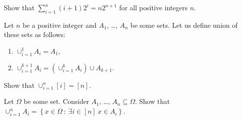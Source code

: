\documentclass[addpoints]{exam}
\begin{document}
  \pagestyle{headandfoot}
  \runningheadrule

  \firstpagefooter{}{}{}
  \runningfooter{}{}{}
  \begin{flushright}

    \vspace{0.2in}
  \end{flushright}

  \begin{questions}
    \question
      Show that $\sum_{i = 1}^n (i + 1) 2^i = n 2^{n + 1}$ for all positive integers
			$n$.

      \begin{solution}[\stretch{1}]
      \end{solution}
      \newpage
    \question
      Let $n$ be a positive integer and $A_1$, \dots, $A_n$ be some sets.
			Let us define union of these sets as follows:
			\begin{enumerate}
			    \item $\cup_{i = 1}^1 A_i = A_1$,
			    \item $\cup_{i = 1}^{k + 1} A_i =
			        (\cup_{i = 1}^{k} A_i) \cup A_{k + 1}$.
			\end{enumerate}
			
			Show that $\cup_{i = 1}^n [i] = [n]$.

      \begin{solution}[\stretch{1}]
      \end{solution}
      \newpage
    \question[10]
      Let $\Omega$ be some set. Consider $A_1$, \dots, $A_n \subseteq \Omega$.
			Show that
			$\cup_{i = 1}^n A_i =
			    \left\{x \in \Omega ~:~ \exists i \in [n] \  x \in A_i \right\}$.

      \begin{solution}[\stretch{1}]
      \end{solution}
      \newpage
  \end{questions}
\end{document}
